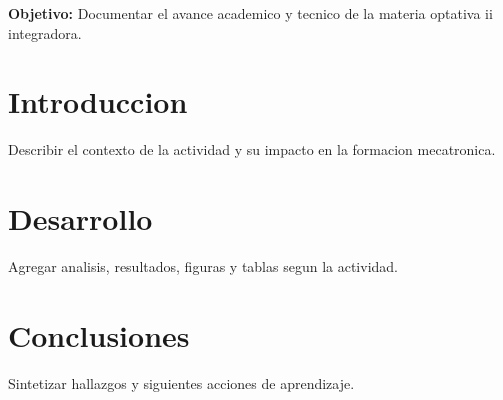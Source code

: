 \documentclass[spanish,letterpaper,oneside]{article}
\begin{document}
\templatePortrait
\templatePagecfg
\onehalfspacing

\begin{abstractd}
\textbf{Objetivo:} Documentar el avance academico y tecnico de la materia optativa ii integradora.
\end{abstractd}

\templateIndex
\templateFinalcfg

\section{Introduccion}
Describir el contexto de la actividad y su impacto en la formacion mecatronica.

\section{Desarrollo}
Agregar analisis, resultados, figuras y tablas segun la actividad.

\section{Conclusiones}
Sintetizar hallazgos y siguientes acciones de aprendizaje.



\end{document}

